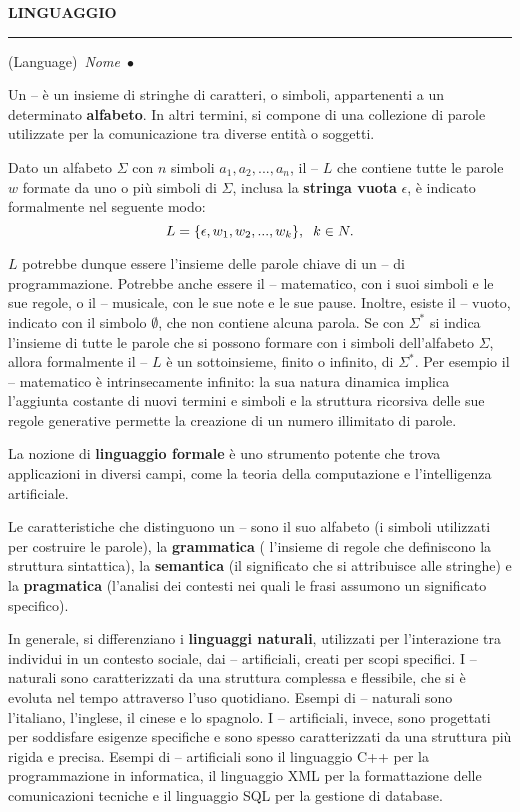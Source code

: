 \documentclass[10pt,a4paper,twoside]{article} %
\newcommand{\entry}[4]{\noindent\textbf{\MakeUppercase{#1}}\markboth{#1}{#1}\par
\vspace{0.5\baselineskip} %
\noindent\hrule\par
\vspace{0.5\baselineskip} %
{(#2)}\ \textit{#3}\ $\bullet$\
{#4}\\%
}
\begin{document}
\begin{multicols*}{2}
\entry{Linguaggio}{Language}{Nome}{
    Un -- è un insieme di stringhe di caratteri, o simboli, appartenenti
    a un determinato \textbf{alfabeto}. In altri termini, si compone di una
    collezione di parole utilizzate per la comunicazione tra diverse entità o
    soggetti. 
    
    Dato un alfabeto $\Sigma$ con $n$ simboli $a_1, a_2, ..., a_n$,
    il -- $L$ che contiene tutte le parole $w$ formate da uno o più simboli
    di $\Sigma$, inclusa la \textbf{stringa vuota} $\epsilon$, è indicato
    formalmente nel seguente modo:
    \[
        L=\lbrace\epsilon, w_1, w_2, ..., w_k\rbrace,\hspace*{0.2cm}k\in N.
    \]

    $L$ potrebbe dunque essere l'insieme delle parole chiave di un -- di
    programmazione. Potrebbe anche essere il -- matematico, con i suoi simboli e
    le sue regole, o il -- musicale, con le sue note e le sue pause. Inoltre,
    esiste il -- vuoto, indicato con il simbolo $\emptyset$, che non contiene
    alcuna parola. Se con $\Sigma^*$  si indica l'insieme di tutte le parole che
    si possono formare con i simboli dell'alfabeto $\Sigma$, allora formalmente
    il -- $L$ è un sottoinsieme, finito o infinito, di $\Sigma^*$. Per
    esempio il -- matematico è intrinsecamente infinito: la sua natura dinamica
    implica l'aggiunta costante di nuovi termini e simboli e la struttura
    ricorsiva delle sue regole generative permette la creazione di un numero 
    illimitato di parole.
    
    La nozione di \textbf{linguaggio formale} è uno strumento
    potente che trova applicazioni in diversi campi, come la teoria della
    computazione e l'intelligenza artificiale. 
    
    Le caratteristiche che distinguono un -- sono il suo alfabeto (i
    simboli utilizzati per costruire le parole), la \textbf{grammatica} (
    l'insieme di regole che definiscono la struttura sintattica), la \textbf{semantica}
    (il significato che si attribuisce alle stringhe) e la \textbf{pragmatica}
    (l'analisi dei contesti nei quali le frasi assumono un significato specifico).

    In generale, si differenziano i \textbf{linguaggi naturali}, utilizzati per
    l'interazione tra individui in un contesto sociale, dai -- artificiali,
    creati per scopi specifici. I -- naturali sono caratterizzati da una
    struttura complessa e flessibile, che si è evoluta nel tempo attraverso
    l'uso quotidiano. Esempi di -- naturali sono l'italiano, l'inglese, il
    cinese e lo spagnolo. I -- artificiali, invece, sono progettati per
    soddisfare esigenze specifiche e sono spesso caratterizzati da una struttura
    più rigida e precisa. Esempi di -- artificiali sono il linguaggio C++ per la
    programmazione in informatica, il linguaggio XML per la formattazione delle
    comunicazioni tecniche e il linguaggio SQL per la gestione di database.    

}
\end{multicols*}
\end{document}

